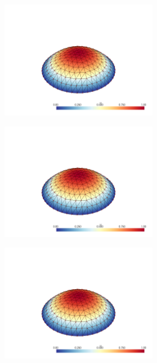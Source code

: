 \documentclass[
  11pt,
]{article}
\let\origfigure\figure
\let\endorigfigure\endfigure
\renewenvironment{figure}[1][2] {
    \expandafter\origfigure\expandafter[H]
} {
    \endorigfigure
}
\begin{document}
\begin{figure}
\centering
\includegraphics[width=0.5\textwidth,height=\textheight]{../img/mesh2-gauss02.png}
\caption{Finite element solution for problem 1 over mesh number 2 and
order-2 numerical integration.}
\end{figure}

\begin{figure}
\centering
\includegraphics[width=0.5\textwidth,height=\textheight]{../img/mesh2-gauss05.png}
\caption{Finite element solution for problem 1 over mesh number 2 and
order-5 numerical integration.}
\end{figure}

\begin{figure}
\centering
\includegraphics[width=0.5\textwidth,height=\textheight]{../img/mesh2-gauss08.png}
\caption{Finite element solution for problem 1 over mesh number 2 and
order-8 numerical integration.}
\end{figure}
\end{document}
